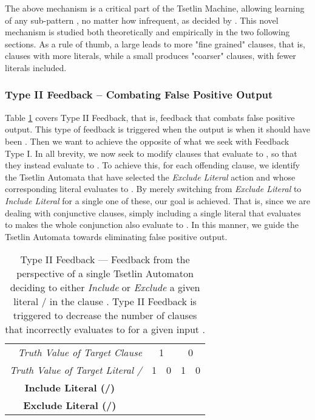 \documentclass[11pt,a4paper]{article}
\newcommand{\True}{\mbox{1}}
\newcommand{\False}{\mbox{0}}
\begin{document}
 The above mechanism is a critical part of the Tsetlin Machine, allowing learning of any sub-pattern , no matter how infrequent, as decided by . This novel mechanism is studied both theoretically and empirically in the two following sections. As a rule of thumb, a large  leads to more "fine grained" clauses, that is, clauses with more literals, while a small  produces "coarser" clauses, with fewer literals included.

\subsubsection{Type II Feedback -- Combating False Positive Output }

Table \ref{table:type_ii_feedback} covers Type II Feedback, that is, feedback that combats false positive output. This type of feedback is triggered when the output is  when it should have been . Then we want to achieve the opposite of what we seek with Feedback Type I. In all brevity, we now seek to modify clauses that evaluate to , so that they instead evaluate to . To achieve this, for each offending clause, we identify the Tsetlin Automata that have selected the \emph{Exclude Literal} action and whose corresponding literal evaluates to . By merely switching from \emph{Exclude Literal} to \emph{Include Literal} for a single one of these, our goal is achieved. That is, since we are dealing with conjunctive clauses, simply including a single literal that evaluates to  makes the whole conjunction also evaluate to . In this manner, we guide the  Tsetlin Automata towards eliminating false positive output.
\begin{table}[bh!]
\centering
\begin{tabular}{c|ccccc}
\multicolumn{2}{r|}{\it Truth Value of Target Clause }&\multicolumn{2}{c}{\True}&\multicolumn{2}{c}{\False}\\  
\multicolumn{2}{r|}{\it Truth Value of Target Literal /}&{\True}&{\False}&{\True}&{\False}\\
 \hline
 \hline
    \multirow{3}{*}{\bf Include Literal (/)}&\multicolumn{1}{c|}{}&&&&\\
    &\multicolumn{1}{c|}{}&&&&\\
  &\multicolumn{1}{c|}{}&&&&\\
  \hline
  \multirow{3}{*}{\bf Exclude Literal (/)}&\multicolumn{1}{c|}{}&&&&\\
  &\multicolumn{1}{c|}{}&&& &\\
  &\multicolumn{1}{c|}{}&&&&\\
  \hline
\end{tabular}
\caption{Type II Feedback --- Feedback from the perspective of a single Tsetlin Automaton deciding to either \emph{Include} or \emph{Exclude} a given literal / in the clause . Type II Feedback is triggered to decrease the number of clauses that incorrectly evaluates to  for a given input .}
\label{table:type_ii_feedback}
\end{table}
\end{document}
